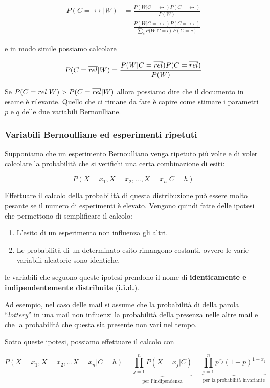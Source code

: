 \begin{align*}
	P(C=\rel |W) &= \frac{P(W|C=\rel)P(C = \rel)}{P(W)} \\
	             &= \frac{P(W|C=\rel)P(C = \rel)}{\sum\limits_c P(W|C = c)|P(C = c)}
\end{align*}

\noindent e in modo simile possiamo calcolare

$$
P(C=\overline{rel} |W) = \frac{P(W|C=\overline{rel})P(C = \overline{rel})}{P(W)}
$$

Se $P(C=rel |W) > P(C=\overline{rel} |W)$ allora possiamo dire che il documento in esame è rilevante.
Quello che ci rimane da fare è capire come stimare i parametri $p$ e $q$ delle due variabili Bernoulliane.

\subsubsection{Variabili Bernoulliane ed esperimenti ripetuti}

Supponiamo che un esperimento Bernoulliano venga ripetuto più volte e di voler calcolare la probabilità che si verifichi una certa combinazione di esiti:

$$
P(X = x_1, X=x_2, \ldots, X = x_n | C = h)
$$

\noindent Effettuare il calcolo della probabilità di questa distribuzione può essere molto pesante se il numero di esperimenti è elevato.
Vengono quindi fatte delle ipotesi che permettono di semplificare il calcolo:

\begin{enumerate}
	\item L'esito di un esperimento non influenza gli altri.
	\item Le probabilità di un determinato esito rimangono costanti, ovvero le varie variabili aleatorie sono identiche.
\end{enumerate}

\noindent le variabili che seguono queste ipotesi prendono il nome di \textbf{identicamente e indipendentemente distribuite} (\textbf{i.i.d.}).

Ad esempio, nel caso delle mail si assume che la probabilità di della parola ``\textit{lottery}'' in una mail non influenzi la probabilità della presenza nelle altre mail e che la probabilità che questa sia presente non vari nel tempo.

Sotto queste ipotesi, possiamo effettuare il calcolo con

$$
P(X = x_1, X=x_2, \ldots X = x_n | C = h) = \underbrace{\prod\limits_{j = 1}^{n} P(X = x_j | C)}_{\text{per l'indipendenza}} = \underbrace{\prod\limits_{i = 1}^{n} p^{x_j}(1-p)^{1-{x_j}}}_{\text{per la probabilità invariante}}
$$

